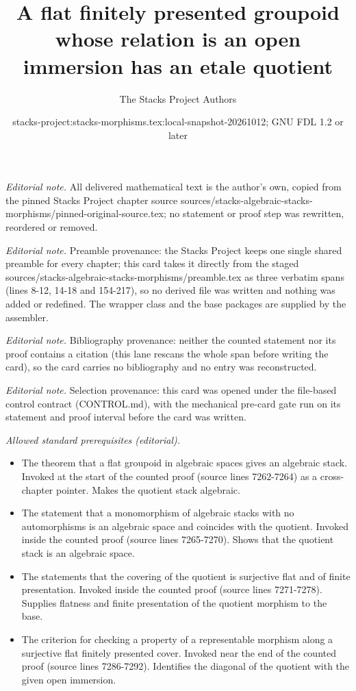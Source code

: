 \documentclass[10pt,a4paper]{amsart}
\title{A flat finitely presented groupoid whose relation is an open immersion has an etale quotient}
\author{The Stacks Project Authors}
\date{stacks-project:stacks-morphisms.tex:local-snapshot-20261012; GNU FDL 1.2 or later}
\theoremstyle{plain}
\theoremstyle{definition}
\theoremstyle{remark}
\numberwithin{equation}{subsection}
\begin{document}
\maketitle
\noindent\textit{Editorial note.} All delivered mathematical text is the author's own, copied from the pinned Stacks Project chapter source sources/stacks-algebraic-stacks-morphisms/pinned-original-source.tex; no statement or proof step was rewritten, reordered or removed.\par\medskip
\noindent\textit{Editorial note.} Preamble provenance: the Stacks Project keeps one single shared preamble for every chapter; this card takes it directly from the staged sources/stacks-algebraic-stacks-morphisms/preamble.tex as three verbatim spans (lines 8-12, 14-18 and 154-217), so no derived file was written and nothing was added or redefined. The wrapper class and the base packages are supplied by the assembler.\par\medskip
\noindent\textit{Editorial note.} Bibliography provenance: neither the counted statement nor its proof contains a citation (this lane rescans the whole span before writing the card), so the card carries no bibliography and no entry was reconstructed.\par\medskip
\noindent\textit{Editorial note.} Selection provenance: this card was opened under the file-based control contract (CONTROL.md), with the mechanical pre-card gate run on its statement and proof interval before the card was written.\par\medskip
\noindent\textit{Allowed standard prerequisites (editorial).}\begin{itemize}
\item The theorem that a flat groupoid in algebraic spaces gives an algebraic stack. Invoked at the start of the counted proof (source lines 7262-7264) as a cross-chapter pointer. Makes the quotient stack algebraic.
\item The statement that a monomorphism of algebraic stacks with no automorphisms is an algebraic space and coincides with the quotient. Invoked inside the counted proof (source lines 7265-7270). Shows that the quotient stack is an algebraic space.
\item The statements that the covering of the quotient is surjective flat and of finite presentation. Invoked inside the counted proof (source lines 7271-7278). Supplies flatness and finite presentation of the quotient morphism to the base.
\item The criterion for checking a property of a representable morphism along a surjective flat finitely presented cover. Invoked near the end of the counted proof (source lines 7286-7292). Identifies the diagonal of the quotient with the given open immersion.
\end{itemize}\medskip
\end{document}
